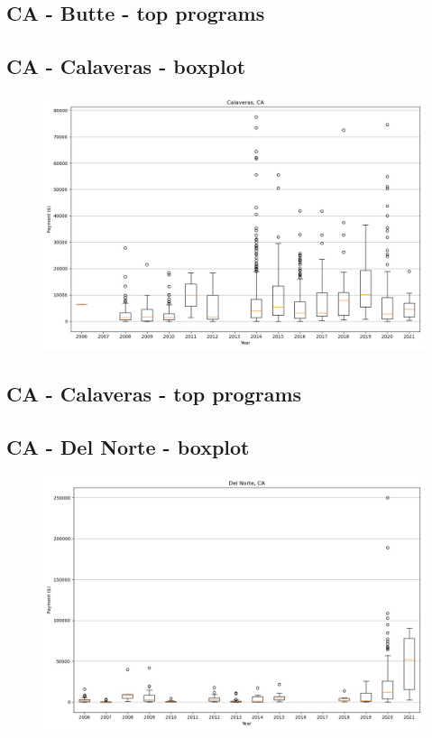 \subsection*{CA - Butte - top programs}

\newpage
\subsection*{CA - Calaveras - boxplot}
\begin{figure}[h]
\centering
\includegraphics[width=7in]{../output/boxplots/counties/Calaveras-CA_boxplot.png}
\end{figure}


\subsection*{CA - Calaveras - top programs}

\newpage
\subsection*{CA - Del Norte - boxplot}
\begin{figure}[h]
\centering
\includegraphics[width=7in]{../output/boxplots/counties/Del Norte-CA_boxplot.png}
\end{figure}


